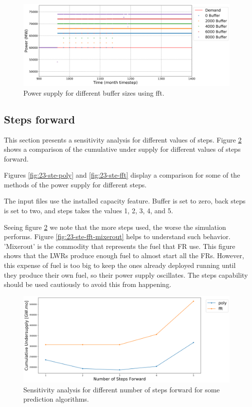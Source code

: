 \documentclass[11pt]{article}
\begin{document}
\begin{figure}[H]
	\centering
	\includegraphics[width=\textwidth]{23-figures/23-power-buffer-fft.png} 
	\hfill
    \caption{Power supply for different buffer sizes using fft.}
	\label{fig:23-buf-fft}
\end{figure}

\subsection{Steps forward}

This section presents a sensitivity analysis for different values of steps.
Figure \ref{fig:23-steps} shows a comparison of the cumulative under supply for different values of steps forward.

Figures \ref{fig:23-ste-poly} and \ref{fig:23-ste-fft} display a comparison for some of the methods of the power supply for different steps.

The input files use the installed capacity feature. Buffer is set to zero, back steps is set to two, and steps takes the values 1, 2, 3, 4, and 5.

Seeing figure \ref{fig:23-steps} we note that the more steps used, the worse the simulation performs. Figure \ref{fig:23-ste-fft-mixerout} helps to understand such behavior. 'Mixerout' is the commodity that represents the fuel that FR use. This figure shows that the LWRs produce enough fuel to almost start all the FRs. However, this expense of fuel is too big to keep the ones already deployed running until they produce their own fuel, so their power supply oscillates. The steps capability should be used cautiously to avoid this from happening.

\begin{figure}[H]
	\centering
	\includegraphics[width=\textwidth]{23-figures/23-sens-steps.png} 
	\hfill
	\caption{Sensitivity analysis for different number of steps forward for some prediction algorithms.}
	\label{fig:23-steps}
\end{figure}
\end{document}
